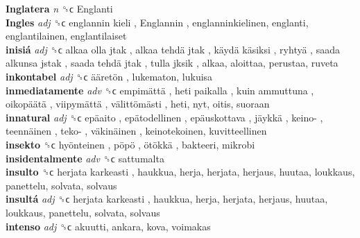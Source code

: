 \textbf{Inglatera} \emph{n}  ␝ϲ   Englanti   \\
\textbf{Ingles} \emph{adj}  ␝ϲ   englannin kieli ,  Englannin , englanninkielinen, englanti, englantilainen, englantilaiset  \\
\textbf{inisiá} \emph{adj}  ␝ϲ   alkaa olla jtak ,  alkaa tehdä jtak ,  käydä käsiksi ,  ryhtyä ,  saada alkunsa jstak ,  saada tehdä jtak ,  tulla jksik , alkaa, aloittaa, perustaa, ruveta  \\
\textbf{inkontabel} \emph{adj}  ␝ϲ   ääretön , lukematon, lukuisa  \\
\textbf{inmediatamente} \emph{adv}  ␝ϲ   empimättä ,  heti paikalla ,  kuin ammuttuna ,  oikopäätä ,  viipymättä ,  välittömästi , heti, nyt, oitis, suoraan  \\
\textbf{innatural} \emph{adj}  ␝ϲ   epäaito ,  epätodellinen ,  epäuskottava ,  jäykkä ,  keino- ,  teennäinen ,  teko- ,  väkinäinen , keinotekoinen, kuvitteellinen  \\
\textbf{insekto} ␝ϲ   hyönteinen ,  pöpö ,  ötökkä , bakteeri, mikrobi  \\
\textbf{insidentalmente} \emph{adv}  ␝ϲ  sattumalta  \\
\textbf{insulto} ␝ϲ   herjata karkeasti , haukkua, herja, herjata, herjaus, huutaa, loukkaus, panettelu, solvata, solvaus  \\
\textbf{insultá} \emph{adj}  ␝ϲ   herjata karkeasti , haukkua, herja, herjata, herjaus, huutaa, loukkaus, panettelu, solvata, solvaus  \\
\textbf{intenso} \emph{adj}  ␝ϲ  akuutti, ankara, kova, voimakas  \\
